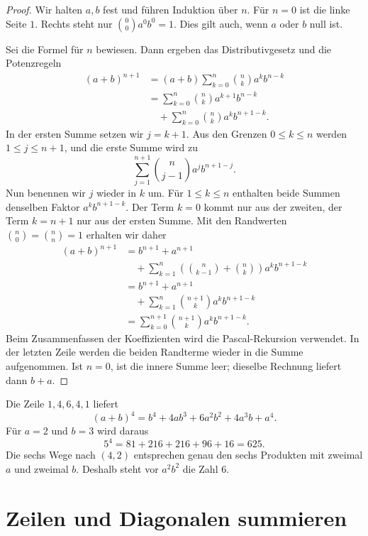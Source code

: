 \begin{proof}
Wir halten $a,b$ fest und führen Induktion über $n$.
Für $n=0$ ist die linke Seite $1$. Rechts steht nur
$\binom00a^0b^0=1$. Dies gilt auch, wenn $a$ oder $b$ null ist.

Sei die Formel für $n$ bewiesen. Dann ergeben das Distributivgesetz
und die Potenzregeln
\[
 \begin{aligned}
 (a+b)^{n+1}
 &=(a+b)\sum_{k=0}^n\binom nk a^k b^{n-k}\\
 &=\sum_{k=0}^n\binom nk a^{k+1}b^{n-k}\\
 &\quad+\sum_{k=0}^n\binom nk a^k b^{n+1-k}.
 \end{aligned}
\]
In der ersten Summe setzen wir $j=k+1$. Aus den Grenzen $0\le k\le n$
werden $1\le j\le n+1$, und die erste Summe wird zu
\[
 \sum_{j=1}^{n+1}\binom n{j-1}a^j b^{n+1-j}.
\]
Nun benennen wir $j$ wieder in $k$ um. Für $1\le k\le n$ enthalten
beide Summen denselben Faktor $a^k b^{n+1-k}$.
Der Term $k=0$ kommt nur aus der zweiten, der Term $k=n+1$ nur
aus der ersten Summe. Mit den Randwerten $\binom n0=\binom nn=1$
erhalten wir daher
\[
 \begin{aligned}
 (a+b)^{n+1}
 &=b^{n+1}+a^{n+1}\\
 &\quad+\sum_{k=1}^n\left(\binom n{k-1}+\binom nk\right)
        a^k b^{n+1-k}\\
 &=b^{n+1}+a^{n+1}\\
 &\quad+\sum_{k=1}^n\binom{n+1}k a^k b^{n+1-k}\\
 &=\sum_{k=0}^{n+1}\binom{n+1}k a^k b^{n+1-k}.
 \end{aligned}
\]
Beim Zusammenfassen der Koeffizienten wird die Pascal-Rekursion
verwendet. In der letzten Zeile werden
die beiden Randterme wieder in die Summe aufgenommen. Ist $n=0$,
ist die innere Summe leer; dieselbe Rechnung liefert dann $b+a$.
\end{proof}

\begin{beispiel}
Die Zeile $1,4,6,4,1$ liefert
\[
 (a+b)^4=b^4+4ab^3+6a^2b^2+4a^3b+a^4.
\]
Für $a=2$ und $b=3$ wird daraus
\[
 5^4=81+216+216+96+16=625.
\]
Die sechs Wege nach $(4,2)$ entsprechen genau den sechs Produkten
mit zweimal $a$ und zweimal $b$. Deshalb steht vor $a^2b^2$ die Zahl $6$.
\end{beispiel}

\section{Zeilen und Diagonalen summieren}
\label{bin:sums}

